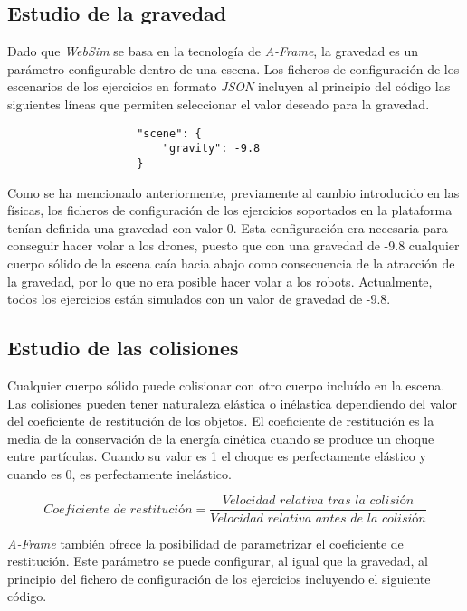\subsection{Estudio de la gravedad} 
Dado que \textit{WebSim} se basa en la tecnología de \textit{A-Frame}, la gravedad es un parámetro configurable dentro de una escena. Los ficheros de configuración de los escenarios de los ejercicios en formato \textit{JSON} incluyen al principio del código las siguientes líneas que permiten seleccionar el valor deseado para la gravedad.

\begin{verbatim}
                    "scene": {
                        "gravity": -9.8
                    }
\end{verbatim}

Como se ha mencionado anteriormente, previamente al cambio introducido en las físicas, los ficheros de configuración de los ejercicios soportados en la plataforma tenían definida una gravedad con valor 0. Esta configuración era necesaria para conseguir hacer volar a los drones, puesto que con una gravedad de -9.8 cualquier cuerpo sólido de la escena caía hacia abajo como consecuencia de la atracción de la gravedad, por lo que no era posible hacer volar a los robots. Actualmente, todos los ejercicios están simulados con un valor de gravedad de -9.8.  \newline

\subsection{Estudio de las colisiones}
Cualquier cuerpo sólido puede colisionar con otro cuerpo incluído en la escena. Las colisiones pueden tener naturaleza elástica o inélastica dependiendo del valor del coeficiente de restitución de los objetos. El coeficiente de restitución es la media de la conservación de la energía cinética cuando se produce un choque entre partículas. Cuando su valor es 1 el choque es perfectamente elástico y cuando es 0, es perfectamente inelástico. 

\begin{equation}
   Coeficiente \,\, de \,\,restitución = \frac{Velocidad \,\, relativa \,\, tras \,\, la \,\, colisión}{Velocidad \,\, relativa \,\, antes \,\, de \,\, la \,\, colisión}
\end{equation} \newline

\textit{A-Frame} también ofrece la posibilidad de parametrizar el coeficiente de restitución. Este parámetro se puede configurar, al igual que la gravedad, al principio del fichero de configuración de los ejercicios incluyendo el siguiente código.

